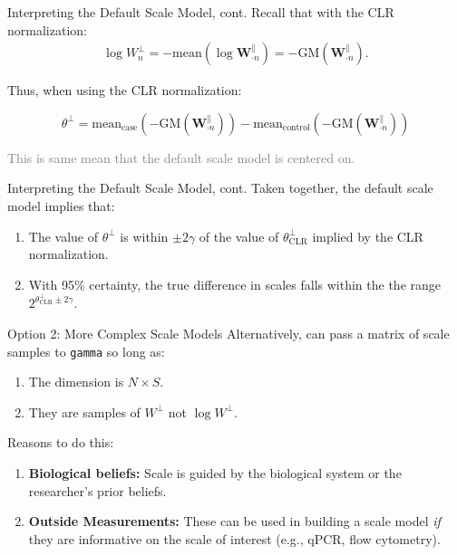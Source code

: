 \documentclass[
  ignorenonframetext,
]{beamer}
\providecommand{\tightlist}{%
  \setlength{\itemsep}{0pt}\setlength{\parskip}{0pt}}
\begin{document}
\begin{frame}{Interpreting the Default Scale Model, cont.}
\protect\hypertarget{interpreting-the-default-scale-model-cont.-1}{}
Recall that with the CLR normalization: \begin{align*}
\log W_n^\perp = -\text{mean}(\log \mathbf{W}_{\cdot n}^\parallel) = - \text{GM}( \mathbf{W}_{\cdot n}^\parallel).
\end{align*}

Thus, when using the CLR normalization:

\[\theta^\perp = \text{mean}_{\text{case}}(-\text{GM}( \mathbf{W}_{\cdot n}^\parallel)) - \text{mean}_{\text{control}}(-\text{GM}( \mathbf{W}_{\cdot n}^\parallel)) \]

\textcolor{gray}{This is same mean that the default scale model is centered on.}
\end{frame}

\begin{frame}{Interpreting the Default Scale Model, cont.}
\protect\hypertarget{interpreting-the-default-scale-model-cont.-2}{}
Taken together, the default scale model implies that:

\begin{enumerate}
\item
  The value of \(\theta^\perp\) is within \(\pm 2 \gamma\) of the value
  of \(\theta^\perp_{\text{CLR}}\) implied by the CLR normalization.
\item
  With 95\% certainty, the true difference in scales falls within the
  the range \(2^{\theta_{\text{CLR}}^\perp \pm 2 \gamma}\).
\end{enumerate}
\end{frame}

\begin{frame}[fragile]{Option 2: More Complex Scale Models}
\protect\hypertarget{option-2-more-complex-scale-models}{}
Alternatively, can pass a matrix of scale samples to \texttt{gamma} so
long as:

\begin{enumerate}
\tightlist
\item
  The dimension is \(N \times S\).
\item
  They are samples of \(W^\perp\) not \(\log W^\perp\).
\end{enumerate}

Reasons to do this:

\begin{enumerate}
\item
  \textbf{Biological beliefs:} Scale is guided by the biological system
  or the researcher's prior beliefs.
\item
  \textbf{Outside Measurements:} These can be used in building a scale
  model \emph{if} they are informative on the scale of interest (e.g.,
  qPCR, flow cytometry).
\end{enumerate}
\end{frame}
\end{document}
